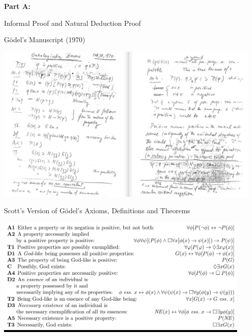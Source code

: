 \begin{transitionframe}
\textbf{Part A:}

Informal Proof and Natural Deduction Proof
\end{transitionframe}




\begin{frame}{G\"odel's Manuscript (1970)}
\bigskip

\begin{changemargin}{-1.2cm}{-1.2cm}
\includegraphics[width=13cm]{Manuscript.png}
\end{changemargin}
\end{frame}

\begin{frame}{Scott's Version of G\"odel's Axioms, Definitions and Theorems}
\begin{changemargin}{-0.9cm}{-0.8cm}
\colorbox{black}{\includegraphics[width=12.4cm]{ScottADT.png}}
\end{changemargin}
\end{frame}


